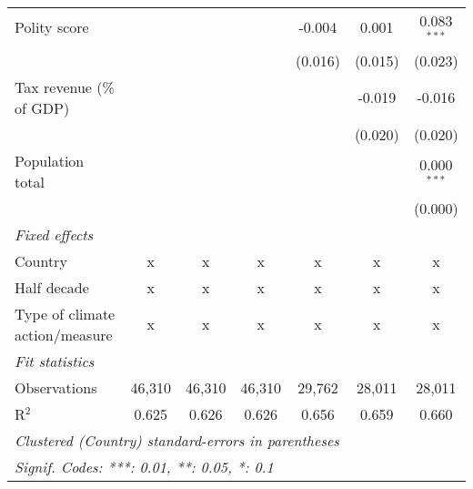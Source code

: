 \begin{tabular}{lcccccc}
   Polity score                                                 &              &                &                & -0.004         & 0.001          & 0.083$^{***}$\\   
                                                                &              &                &                & (0.016)        & (0.015)        & (0.023)\\   
   Tax revenue (\% of GDP)                                      &              &                &                &                & -0.019         & -0.016\\   
                                                                &              &                &                &                & (0.020)        & (0.020)\\   
   Population total                                             &              &                &                &                &                & 0.000$^{***}$\\   
                                                                &              &                &                &                &                & (0.000)\\   
   \emph{Fixed effects}\\
   Country                                                      & x            & x              & x              & x              & x              & x\\  
   Half decade                                                  & x            & x              & x              & x              & x              & x\\  
   Type of climate action/measure                               & x            & x              & x              & x              & x              & x\\  
   \midrule \emph{Fit statistics}\\
   Observations                                                 & 46,310       & 46,310         & 46,310         & 29,762         & 28,011         & 28,011\\  
   R$^2$                                                        & 0.625        & 0.626          & 0.626          & 0.656          & 0.659          & 0.660\\  
   \midrule
   \multicolumn{7}{l}{\emph{Clustered (Country) standard-errors in parentheses}}\\
   \multicolumn{7}{l}{\emph{Signif. Codes: ***: 0.01, **: 0.05, *: 0.1}}\\
\end{tabular}
\par\endgroup


